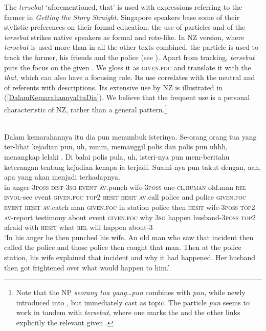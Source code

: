 \documentclass[output=paper
,modfonts
,nonflat]{langsci/langscibook}
\begin{document}
\noindent
The   \emph{tersebut} `aforementioned, that' is used with expressions referring to the farmer in \emph{Getting the Story Straight}. Singapore  speakers base some of their stylistic preferences on their formal education; the use of particles and of the  \emph{tersebut} strikes native speakers as formal and rote-like. In NZ version, where \emph{tersebut} is used more than in all the other texts combined, the particle is used to track the farmer, his friends and the police (see ). Apart from tracking, \emph{tersebut} puts the focus on the given . We gloss it as \textsc{given.foc} and translate it with the  \emph{that}, which can also have a focusing role. Its use correlates with the neutral  and  of referents with descriptions. Its extensive use by NZ is illustrated in (\ref{DalamKemarahannyaItuDia}). We believe that the frequent use is a personal characteristic of NZ, rather than a general pattern.\footnote{Note that the NP \emph{seorang tua yang\ldots pun} combines with \emph{pun}, while newly introduced into , but immediately cast as topic. The particle \emph{pun} seems to work in tandem with \emph{tersebut}, where one marks the  and the other links explicitly the relevant given .}

\ea\label{DalamKemarahannyaItuDia} 
\\
\gll Dalam kemarahannya     itu dia pun  menumbuk isterinya. Se-orang    {orang tua} yang ter-lihat   {\ob}kejadian   pun, uh,   mmm,  memanggil polis  dan   {\ob}polis   pun{\cb}  uhhh, menangkap  {\ob}lelaki . Di balai   polis  pula, uh,   isteri-nya     pun  mem-beritahu keterangan tentang  {\ob}kejadian   kenapa ia  terjadi. Suami-nya       pun  takut  dengan, aah,      apa  yang akan menjadi terhadapnya.\\
in anger-\textsc{3poss} \textsc{dist} \textsc{3sg} \textsc{event} \textsc{av.}punch wife-\textsc{3poss} one-\textsc{cl.human} old.man   \textsc{rel}  \textsc{invol-}see event   \textsc{given.foc} \textsc{top2} \textsc{hesit} \textsc{hesit} \textsc{av.}call      police and  police \textsc{given.foc} \textsc{event} \textsc{hesit} \textsc{av.}catch     man    \textsc{given.foc} in station police then  \textsc{hesit} wife-\textsc{3poss} \textsc{top2} \textsc{av-}report      testimony  about   event    \textsc{given.foc} why    \textsc{3sg} happen husband-\textsc{3poss} \textsc{top2} afraid with    \textsc{hesit} what \textsc{rel}  will happen  about-3\\
\glt `In his anger he then punched his wife. An old man who saw that incident then called the police and those police then caught that man. Then at the police station, his wife explained that incident and why it had happened. Her husband then got frightened over what would happen to him.'
\z
\end{document}
